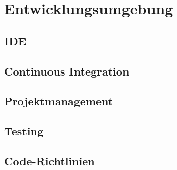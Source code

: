 \chapter{Entwicklungsumgebung}
\label{pd-entwicklungsumgebung}


\section{IDE}


\section{Continuous Integration}


\section{Projektmanagement}


\section{Testing}


\section{Code-Richtlinien}